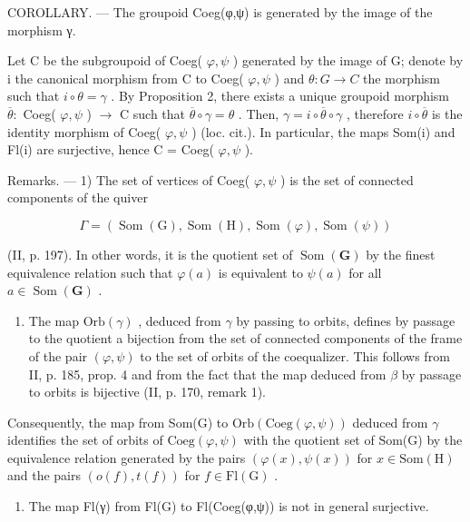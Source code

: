 COROLLARY. --- The groupoid Coeg(φ,ψ) is generated by the image of the morphism γ.

Let C be the subgroupoid of Coeg( \(\varphi,\psi\) ) generated by the image of G; denote by i the canonical morphism from C to Coeg( \(\varphi,\psi\) ) and \(\theta\colon G\to C\) the morphism such that \(i\circ\theta=\gamma\) . By Proposition 2, there exists a unique groupoid morphism \(\overline{\theta}\colon\) Coeg( \(\varphi,\psi\) ) \(\to\) C such that \(\overline{\theta}\circ\gamma=\theta\) . Then, \(\gamma=i\circ\overline{\theta}\circ\gamma\) , therefore \(i\circ\overline{\theta}\) is the identity morphism of Coeg( \(\varphi,\psi\) ) (loc. cit.). In particular, the maps Som(i) and Fl(i) are surjective, hence C = Coeg( \(\varphi,\psi\) ).

Remarks. --- 1) The set of vertices of Coeg( \(\varphi,\psi\) ) is the set of connected components of the quiver

\[
\Gamma = (\operatorname{Som} (\mathrm{G}), \operatorname{Som} (\mathrm{H}), \operatorname{Som} (\varphi), \operatorname{Som} (\psi))
\]

(II, p. 197). In other words, it is the quotient set of \(\operatorname{Som}(\mathbf{G})\) by the finest equivalence relation such that \(\varphi(a)\) is equivalent to \(\psi(a)\) for all \(a \in \operatorname{Som}(\mathbf{G})\) .

\begin{enumerate}
\def\labelenumi{\arabic{enumi})}
\setcounter{enumi}{1}
\tightlist
\item
  The map \(\mathrm{Orb}(\gamma)\) , deduced from \(\gamma\) by passing to orbits, defines by passage to the quotient a bijection from the set of connected components of the frame of the pair \((\varphi,\psi)\) to the set of orbits of the coequalizer. This follows from II, p. 185, prop. 4 and from the fact that the map deduced from \(\beta\) by passage to orbits is bijective (II, p. 170, remark 1).
\end{enumerate}

Consequently, the map from Som(G) to \(\mathrm{Orb}(\mathrm{Coeg}(\varphi,\psi))\) deduced from \(\gamma\) identifies the set of orbits of \(\mathrm{Coeg}(\varphi,\psi)\) with the quotient set of Som(G) by the equivalence relation generated by the pairs \((\varphi(x),\psi(x))\) for \(x\in\mathrm{Som(H)}\) and the pairs \((o(f),t(f))\) for \(f\in\mathrm{Fl(G)}\) .

\begin{enumerate}
\def\labelenumi{\arabic{enumi})}
\setcounter{enumi}{2}
\tightlist
\item
  The map Fl(γ) from Fl(G) to Fl(Coeg(φ,ψ)) is not in general surjective.
\end{enumerate}

